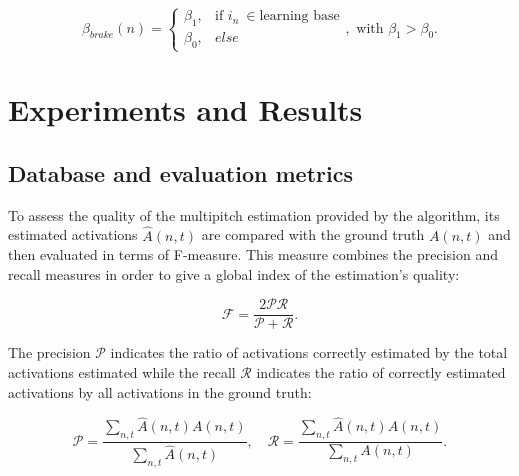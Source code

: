 \documentclass{article}
\begin{document}
\begin{equation}
\beta_{brake}(n) = \left\{
\begin{array}{ll}
\beta_1, & \textrm{if }i_n\ \in \textrm{learning base} \\
\beta_0, & else
\end{array}
\right. , \textrm{ with } \beta_1 > \beta_0.
\end{equation}


\section{Experiments and Results}
\label{sec:expres}

\vspace{0.2cm}

\subsection{Database and evaluation metrics}

\vspace{0.1cm}

To assess the quality of the multipitch estimation provided by the algorithm, %
its estimated activations $\hat{A}(n,t)$ are compared with the ground truth $A(n,t)$ and then evaluated in terms of F-measure. This measure combines the precision and recall measures in order to give a global index of the estimation's quality:

\vspace{0.1cm}

$$\mathcal{F}  = \frac{2\mathcal{P}\mathcal{R}}{\mathcal{P}+\mathcal{R}}.$$

\vspace{0.2cm}

The precision $\mathcal{P}$ indicates the ratio of activations correctly estimated by the total activations estimated while the recall $\mathcal{R}$ indicates the ratio of correctly estimated activations by all activations in the ground truth:

\vspace{0.1cm}

$$\mathcal{P}  = \frac{\sum_{n,t}\hat{A}(n,t)A(n,t)}{\sum_{n,t}\hat{A}(n,t)}, \quad \mathcal{R}  = \frac{\sum_{n,t}\hat{A}(n,t)A(n,t)}{\sum_{n,t}A(n,t)}.$$

\vspace{0.2cm}
\end{document}
